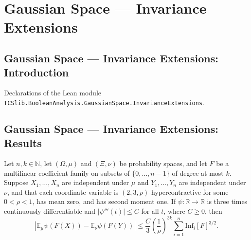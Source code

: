 \section{Gaussian Space --- Invariance Extensions}
\subsection*{Gaussian Space --- Invariance Extensions: Introduction}

Declarations of the Lean module \texttt{TCSlib.BooleanAnalysis.GaussianSpace.InvarianceExtensions}.

\subsection*{Gaussian Space --- Invariance Extensions: Results}

\begin{theorem}
\label{BooleanAnalysis.GaussianSpace.invariance_c3}
\leanok
{}
Let $n,k\in\mathbb N$, let $(\Omega,\mu)$ and $(\Xi,\nu)$ be probability spaces, and let
$F$ be a multilinear coefficient family on subsets of $\{0,\ldots,n-1\}$ of degree at
most $k$. Suppose $X_1,\ldots,X_n$ are independent under $\mu$ and $Y_1,\ldots,Y_n$ are
independent under $\nu$, and that each coordinate variable is
$(2,3,\rho)$-hypercontractive for some $0<\rho<1$, has mean zero, and has second moment
one. If $\psi:\mathbb R\to\mathbb R$ is three times continuously differentiable and
$|\psi'''(t)|\le C$ for all $t$, where $C\ge0$, then
\[
\left|\mathbb E_\mu\psi(F(X))-\mathbb E_\nu\psi(F(Y))\right|
\le \frac{C}{3}\left(\frac1\rho\right)^{3k}\sum_{i=1}^n \mathrm{Inf}_i[F]^{{3}/{2}}.
\]
\end{theorem}

